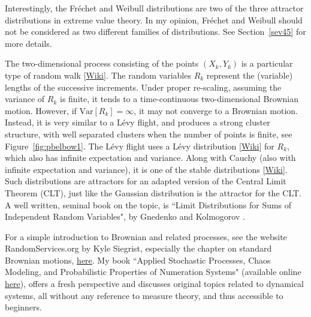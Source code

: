 \documentclass[10pt]{article}
\begin{document}
Interestingly, the Fréchet and Weibull distributions are two of the three
\textcolor{index}{attractor distributions} in \textcolor{index}{extreme value theory}. In my opinion, Fréchet and Weibull should not be considered as two different families of distributions. See Section~\ref{sev45} for more details.

The two-dimensional process consisting of the points $(X_k,Y_k)$ is a particular type of \textcolor{index}{random walk}
[\href{https://en.wikipedia.org/wiki/Random_walk}{Wiki}]. The random variables $R_k$ represent the (variable) lengths of the successive increments. Under proper re-scaling, assuming the variance of $R_k$ is finite, it tends to a time-continuous
two-dimensional Brownian motion. However, if $\mbox{Var}[R_k]=\infty$, it may not converge to a Brownian motion. Instead, it is very similar to a
\textcolor{index}{Lévy flight}, and produces a strong cluster structure, with well separated clusters when the number of points is finite, see Figure~\ref{fig:pbelbow1}. The
Lévy flight uses a \textcolor{index}{Lévy distribution}
[\href{https://bit.ly/3rV7mrq}{Wiki}] for $R_k$, which also has infinite expectation and variance. Along with
\textcolor{index}{Cauchy} (also with infinite expectation and variance), it is one of the \textcolor{index}{stable distributions} [\href{https://en.wikipedia.org/wiki/Stable_distribution}{Wiki}]. Such distributions are attractors
for an adapted version of the \textcolor{index}{Central Limit Theorem} (CLT), just like the Gaussian distribution is the attractor
for the CLT. A well written, seminal book on the topic, is ``Limit Distributions for Sums of Independent Random Variables", by Gnedenko and Kolmogorov \cite{gk1954}.

For a simple introduction to Brownian and related processes, see the website RandomServices.org by Kyle Siegrist, especially the chapter on
standard Brownian motions, \href{https://www.randomservices.org/random/brown/Standard.html}{here}. My
book ``Applied Stochastic Processes, Chaos Modeling, and Probabilistic Properties of Numeration Systems" \cite{vgdyn} (available online
\href{https://github.com/VincentGranville/Stochastic-Processes/blob/master/README.md}{here}), offers a fresh perspective and discusses original topics related to dynamical systems, all without any reference to measure theory, and thus accessible to beginners.  \\
\end{document}
